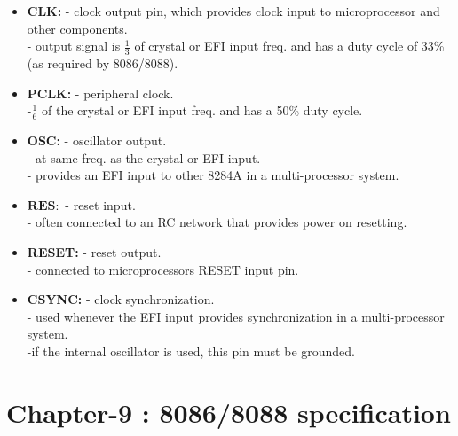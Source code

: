 \documentclass[12pt]{article}
\begin{document}
\begin{itemize}
	\item\textbf{CLK:} - clock output pin, which provides clock input to microprocessor and other components.\\
	
	- output signal is $\frac{1}{3}$ of crystal or EFI input freq. and has a duty cycle of 33\%(as required by 8086/8088).
	
	\item \textbf{PCLK:} - peripheral clock.\\
	-$\frac{1}{6}$ of the crystal or EFI input freq. and has a 50\% duty cycle.
	
	\item \textbf{OSC:} - oscillator output.\\
	- at same freq. as the crystal or EFI input.\\
	- provides an EFI input to other 8284A in a multi-processor system.
	
	\item $\overline{\textbf{RES}}:$ - reset input.\\
	- often connected to an RC network that provides power on resetting.
	
	\item\textbf{RESET:} - reset output.\\
	- connected to microprocessors RESET input pin.
	
	\item \textbf{CSYNC:} - clock synchronization.\\
	- used whenever the EFI input provides synchronization in a multi-processor system.\\
	-if the internal oscillator is used, this pin must be grounded. 
	  
\end{itemize}


\section{Chapter-9 : 8086/8088 specification}
\end{document}
